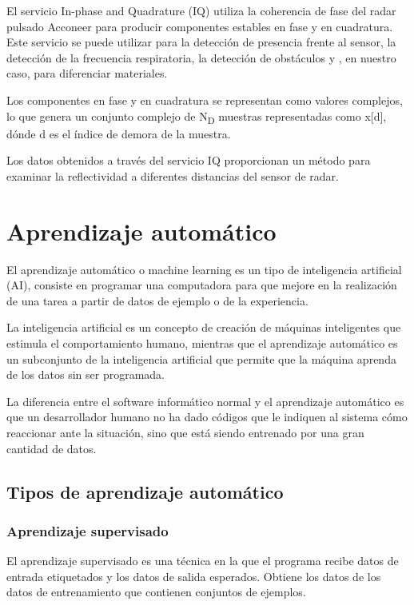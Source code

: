El servicio In-phase and Quadrature (IQ) utiliza la coherencia de fase del radar pulsado Acconeer para producir componentes estables en fase y en cuadratura. Este servicio se puede utilizar para la detección de presencia frente al sensor, la detección de la frecuencia respiratoria, la detección de obstáculos y , en nuestro caso, para diferenciar materiales.

Los componentes en fase y en cuadratura se representan como valores complejos, lo que genera un conjunto complejo de N\textsubscript{D} muestras representadas como x[d], dónde d es el índice de demora de la muestra.

Los datos obtenidos a través del servicio IQ proporcionan un método para examinar la reflectividad a diferentes distancias del sensor de radar.

\section{Aprendizaje automático}

El aprendizaje automático o machine learning es un tipo de inteligencia artificial (AI),
consiste en programar una computadora para que mejore en la realización de una tarea a partir de datos de ejemplo o de la experiencia.

La inteligencia artificial es un concepto de creación de máquinas inteligentes que estimula el comportamiento humano, mientras que el aprendizaje automático es un subconjunto de la inteligencia artificial que permite que la máquina aprenda de los datos sin ser programada.

La diferencia entre el software informático normal y el aprendizaje automático es que un desarrollador humano no ha dado códigos que le indiquen al sistema cómo reaccionar ante la situación, sino que está siendo entrenado por una gran cantidad de datos.

\subsection{Tipos de aprendizaje automático}

\subsubsection{Aprendizaje supervisado}

El aprendizaje supervisado es una técnica en la que el programa recibe datos de entrada etiquetados y los datos de salida esperados. Obtiene los datos de los datos de entrenamiento que contienen conjuntos de ejemplos. 

